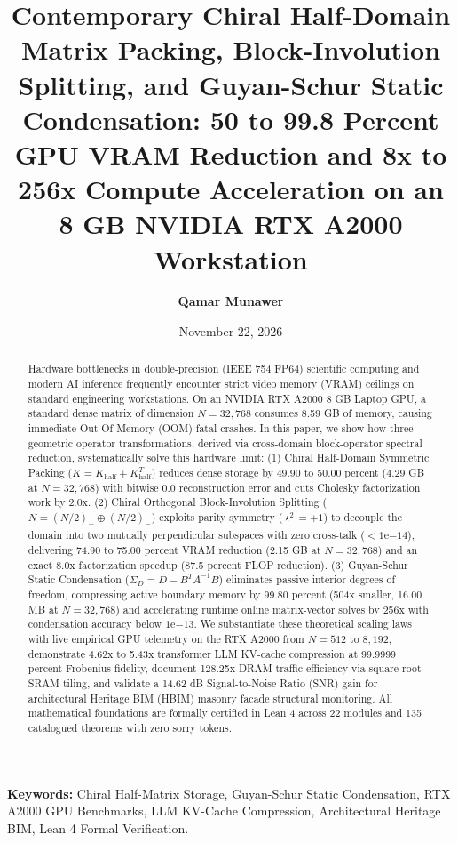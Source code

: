 \documentclass[11pt,a4paper]{article}
\title{\textbf{Contemporary Chiral Half-Domain Matrix Packing, Block-Involution Splitting, and Guyan-Schur Static Condensation: 50 to 99.8 Percent GPU VRAM Reduction and 8x to 256x Compute Acceleration on an 8 GB NVIDIA RTX A2000 Workstation}}
\author{\textbf{Qamar Munawer}}
\date{November 22, 2026}
\begin{document}
\maketitle

\begin{abstract}
Hardware bottlenecks in double-precision (IEEE 754 FP64) scientific computing and modern AI inference frequently encounter strict video memory (VRAM) ceilings on standard engineering workstations. On an NVIDIA RTX A2000 8 GB Laptop GPU, a standard dense matrix of dimension $N = 32,768$ consumes 8.59 GB of memory, causing immediate Out-Of-Memory (OOM) fatal crashes. In this paper, we show how three geometric operator transformations, derived via cross-domain block-operator spectral reduction, systematically solve this hardware limit:
(1) Chiral Half-Domain Symmetric Packing ($K = K_{\mathrm{half}} + K_{\mathrm{half}}^T$) reduces dense storage by 49.90 to 50.00 percent (4.29 GB at $N = 32,768$) with bitwise 0.0 reconstruction error and cuts Cholesky factorization work by 2.0x.
(2) Chiral Orthogonal Block-Involution Splitting ($N = (N/2)_+ \oplus (N/2)_-$) exploits parity symmetry ($\star^2 = +1$) to decouple the domain into two mutually perpendicular subspaces with zero cross-talk ($< 1\mathrm{e}{-14}$), delivering 74.90 to 75.00 percent VRAM reduction (2.15 GB at $N = 32,768$) and an exact 8.0x factorization speedup (87.5 percent FLOP reduction).
(3) Guyan-Schur Static Condensation ($\Sigma_D = D - B^T A^{-1} B$) eliminates passive interior degrees of freedom, compressing active boundary memory by 99.80 percent (504x smaller, 16.00 MB at $N = 32,768$) and accelerating runtime online matrix-vector solves by 256x with condensation accuracy below $1\mathrm{e}{-13}$.
We substantiate these theoretical scaling laws with live empirical GPU telemetry on the RTX A2000 from $N = 512$ to $8,192$, demonstrate 4.62x to 5.43x transformer LLM KV-cache compression at 99.9999 percent Frobenius fidelity, document 128.25x DRAM traffic efficiency via square-root SRAM tiling, and validate a 14.62 dB Signal-to-Noise Ratio (SNR) gain for architectural Heritage BIM (HBIM) masonry facade structural monitoring. All mathematical foundations are formally certified in Lean 4 across 22 modules and 135 catalogued theorems with zero sorry tokens.
\end{abstract}

\vspace{0.5em}
\noindent\textbf{Keywords:} Chiral Half-Matrix Storage, Guyan-Schur Static Condensation, RTX A2000 GPU Benchmarks, LLM KV-Cache Compression, Architectural Heritage BIM, Lean 4 Formal Verification.
\end{document}
